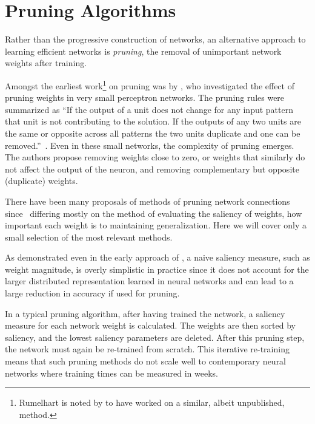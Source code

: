\documentclass[thesis]{subfiles}
\begin{document}
	\section{Pruning Algorithms}
	Rather than the progressive construction of networks, an alternative approach to learning efficient networks is \emph{pruning}, the removal of unimportant network weights after training.

	Amongst the earliest work\footnote{Rumelhart is noted by \citet{hanson1989comparing} to have worked on a similar, albeit unpublished, method.} on pruning was by \citet{sietsma1988neural}, who investigated the effect of pruning weights in very small perceptron networks. The pruning rules were summarized as ``If the output of a unit does not change for any input pattern that unit is not contributing to the solution. If the outputs of any two units are the same or opposite across all patterns the two units duplicate and one can be removed.''~\citep{sietsma1988neural}. Even in these small networks, the complexity of pruning emerges. The authors propose removing weights close to zero, or weights that similarly do not affect the output of the neuron, and removing complementary but opposite (\ie duplicate) weights. %
	
	There have been many proposals of methods of pruning network connections since~\citep{hanson1989comparing, lecun1989optimal, mozer1989using, mozer1989skeletonization, gorodkin1993quantitative, setiono1997penalty,castellano1997iterative,han2015learning,han2015deep,han2016dsd,ullrich2017soft,} differing mostly on the method of evaluating the saliency of weights, \ie how important each weight is to maintaining generalization.  Here we will cover only a small selection of the most relevant methods.

	As demonstrated even in the early approach of \citeauthor{sietsma1988neural}, a naive saliency measure, such as weight magnitude, is overly simplistic in practice since it does not account for the larger distributed representation learned in neural networks and can lead to a large reduction in accuracy if used for pruning.

    In a typical pruning algorithm, after having trained the network, a saliency measure for each network weight is calculated. The weights are then sorted by saliency, and the lowest saliency parameters are deleted. After this pruning step, the network must again be re-trained from scratch. This iterative re-training means that such pruning methods do not scale well to contemporary neural networks where training times can be measured in weeks.
\end{document}
